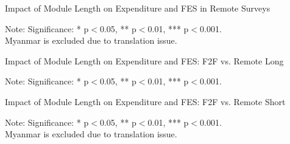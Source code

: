 \documentclass[11pt,harvard]{article}
\begin{document}
\begin{table}[htbp]
	\centering
	\begin{adjustbox}{max width=\textwidth}
		\begin{threeparttable}
			\caption{Impact of Module Length on Expenditure and FES in Remote Surveys}
			\scriptsize
			 
			\label{tab:FES_RM_Form_Length_ECU_CAR}
			\begin{tablenotes}
				\item Note: Significance: * p$<$0.05, ** p$<$0.01, *** p$<$0.001. \\
						 Myanmar is excluded due to translation issue.
			\end{tablenotes}
		\end{threeparttable}
	\end{adjustbox}
\end{table}

\begin{table}[htbp]
	\centering
	\begin{adjustbox}{max width=\textwidth}
		\begin{threeparttable}
			\caption{Impact of Module Length on Expenditure and FES: F2F vs. Remote Long}
			\scriptsize
			 
			\label{tab:FES_F2F_Long_All_Country}
			\begin{tablenotes}
				\item Note: Significance: * p$<$0.05, ** p$<$0.01, *** p$<$0.001. 
			\end{tablenotes}
		\end{threeparttable}
	\end{adjustbox}
\end{table}

\begin{table}[htbp]
	\centering
	\begin{adjustbox}{max width=\textwidth}
		\begin{threeparttable}
			\caption{Impact of Module Length on Expenditure and FES: F2F vs. Remote Short}
			\scriptsize
			 
			\label{tab:FES_F2F_Short_ECU_CAR}
			\begin{tablenotes}
				\item Note: Significance: * p$<$0.05, ** p$<$0.01, *** p$<$0.001. \\
				Myanmar is excluded due to translation issue.
			\end{tablenotes}
		\end{threeparttable}
	\end{adjustbox}
\end{table}
\end{document}

